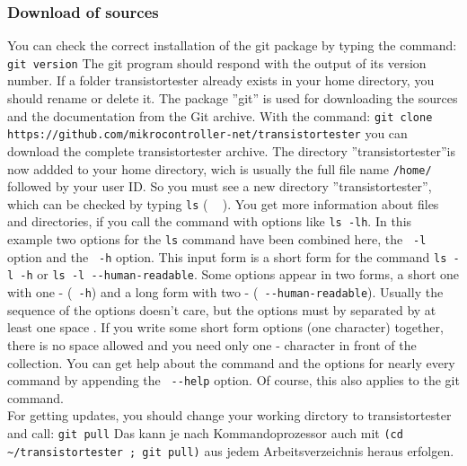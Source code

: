 \subsubsection{Download of sources}

You can check the correct installation of the git package by typing the command:
\large{\newline\verb"git version"\newline}
The git program should respond with the output of its version number.
If a folder transistortester already exists in your home directory,
you should rename or delete it.
The package ''git'' is used for downloading the sources and the documentation from the Git archive.
With the command:
\large{\newline\verb"git clone https://github.com/mikrocontroller-net/transistortester"\newline}
you can download the complete transistortester archive.
The directory ''transistortester''is now addded to your home directory,
wich is usually the full file name \verb"/home/" followed by your user ID.
So you must see a new directory ''transistortester'', which can
be checked by typing \verb"ls" ( \mbox{  \keys{\return}} ).
You get more information about files and directories, if you call
the command with options like {\verb"ls -lh"}.
In this example two options for the \verb"ls" command have been combined here,
the \verb" -l" option and the \verb" -h" option.
This input form is a short form for the command {\verb"ls -l -h"} or
{\verb"ls -l --human-readable"}.
Some options appear in two forms, a short one with one - (\verb" -h") and a long form
with two - (\verb" --human-readable").
Usually the sequence of the options doesn't care, but the options must by separated
by at least one space \keys{\space}.
If you write some short form options (one character) together, there is no space allowed
and you need only one - character in front of the collection.
You can get help about the command and the options for nearly every command by appending
the {\verb" --help"} option.
Of course, this also applies to the git command.\\
For getting updates, you should change your working dirctory to transistortester and call:
\large{\newline\verb"git pull"\newline}
Das kann je nach Kommandoprozessor auch mit
\large{\newline\verb"(cd ~/transistortester ; git pull)"\newline}
aus jedem Arbeitsverzeichnis heraus erfolgen.


